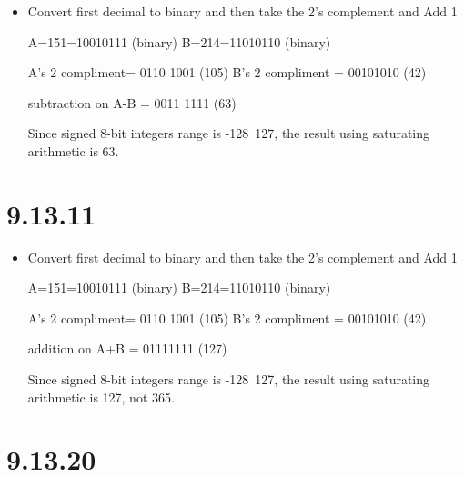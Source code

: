 \documentclass{article}
\begin{document}
\begin{itemize}
    \item Convert first decimal to binary and then take the 2’s complement and Add 1 \newline
    
    A=151=10010111 (binary) \newline
    B=214=11010110 (binary) \newline
    
    A's 2 compliment= 0110 1001 (105) \newline
    B's 2 compliment = 00101010 (42) \newline
    
    subtraction on A-B = 0011 1111 (63) \newline
    
    Since signed 8-bit integers range is -128~127, the result using saturating arithmetic is 63. \newline
    
\end{itemize}

\section{9.13.11}
\large

\begin{itemize}
    \item Convert first decimal to binary and then take the 2’s complement and Add 1 \newline
    
    A=151=10010111 (binary) \newline
    B=214=11010110 (binary) \newline
    
    A's 2 compliment= 0110 1001 (105) \newline
    B's 2 compliment = 00101010 (42) \newline
    
    addition on A+B = 01111111 (127) \newline
    
    Since signed 8-bit integers range is -128~127, the result using saturating arithmetic is 127, not 365. \newline
    
\end{itemize}

\section{9.13.20}
\large
\end{document}
